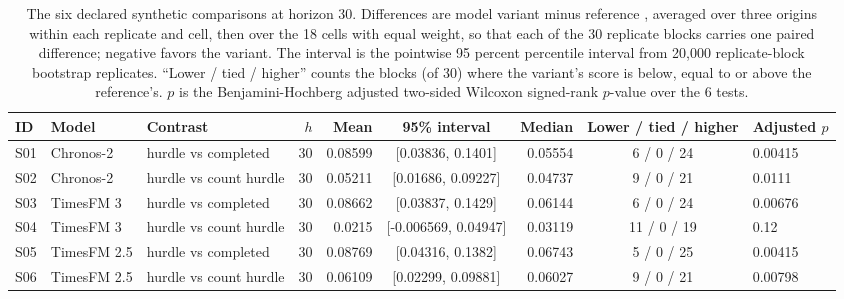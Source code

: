 \begin{table}[t]
\centering\footnotesize\setlength{\tabcolsep}{3.5pt}
\caption{The six declared synthetic comparisons at horizon 30. Differences are model variant minus reference
\qs{}, averaged over three origins within each replicate and cell, then over the 18 cells with equal weight,
so that each of the 30 replicate blocks carries one paired difference; negative favors the variant. The
interval is the pointwise 95 percent percentile interval from 20,000 replicate-block bootstrap replicates.
``Lower / tied / higher'' counts the blocks (of 30) where the variant's score is below, equal to or above
the reference's. $p$ is the Benjamini-Hochberg adjusted two-sided Wilcoxon signed-rank $p$-value over the
6 tests.}
\label{tab:s2syn}
\begin{tabular}{lllrrcrcl}
\toprule
ID & Model & Contrast & $h$ & Mean & 95\% interval & Median & Lower / tied / higher & Adjusted $p$ \\
\midrule
S01 & Chronos-2 & hurdle vs completed & 30 & 0.08599 & [0.03836, 0.1401] & 0.05554 & 6 / 0 / 24 & 0.00415 \\
S02 & Chronos-2 & hurdle vs count hurdle & 30 & 0.05211 & [0.01686, 0.09227] & 0.04737 & 9 / 0 / 21 & 0.0111 \\
S03 & TimesFM 3 & hurdle vs completed & 30 & 0.08662 & [0.03837, 0.1429] & 0.06144 & 6 / 0 / 24 & 0.00676 \\
S04 & TimesFM 3 & hurdle vs count hurdle & 30 & 0.0215 & [-0.006569, 0.04947] & 0.03119 & 11 / 0 / 19 & 0.12 \\
S05 & TimesFM 2.5 & hurdle vs completed & 30 & 0.08769 & [0.04316, 0.1382] & 0.06743 & 5 / 0 / 25 & 0.00415 \\
S06 & TimesFM 2.5 & hurdle vs count hurdle & 30 & 0.06109 & [0.02299, 0.09881] & 0.06027 & 9 / 0 / 21 & 0.00798 \\
\bottomrule
\end{tabular}
\end{table}

